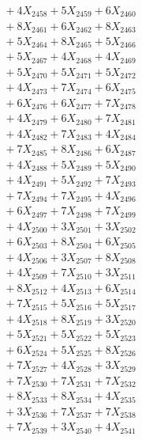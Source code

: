 \documentclass[a4paper,10pt]{article}
\begin{document}
{\begin{align}
&\;  + 4 X_{2458} + 5 X_{2459} + 6 X_{2460} \\[0.3ex]
&\;  + 8 X_{2461} + 6 X_{2462} + 8 X_{2463} \\[0.3ex]
&\;  + 5 X_{2464} + 8 X_{2465} + 5 X_{2466} \\[0.3ex]
&\;  + 5 X_{2467} + 4 X_{2468} + 4 X_{2469} \\[0.5ex]\allowbreak
&\;  + 5 X_{2470} + 5 X_{2471} + 5 X_{2472} \\[0.3ex]
&\;  + 4 X_{2473} + 7 X_{2474} + 6 X_{2475} \\[0.3ex]
&\;  + 6 X_{2476} + 6 X_{2477} + 7 X_{2478} \\[0.3ex]
&\;  + 4 X_{2479} + 6 X_{2480} + 7 X_{2481} \\[0.3ex]
&\;  + 4 X_{2482} + 7 X_{2483} + 4 X_{2484} \\[0.3ex]
&\;  + 7 X_{2485} + 8 X_{2486} + 6 X_{2487} \\[0.3ex]
&\;  + 4 X_{2488} + 5 X_{2489} + 5 X_{2490} \\[0.3ex]
&\;  + 4 X_{2491} + 5 X_{2492} + 7 X_{2493} \\[0.3ex]
&\;  + 7 X_{2494} + 7 X_{2495} + 4 X_{2496} \\[0.3ex]
&\;  + 6 X_{2497} + 7 X_{2498} + 7 X_{2499} \\[0.5ex]\allowbreak
&\;  + 4 X_{2500} + 3 X_{2501} + 3 X_{2502} \\[0.3ex]
&\;  + 6 X_{2503} + 8 X_{2504} + 6 X_{2505} \\[0.3ex]
&\;  + 4 X_{2506} + 3 X_{2507} + 8 X_{2508} \\[0.3ex]
&\;  + 4 X_{2509} + 7 X_{2510} + 3 X_{2511} \\[0.3ex]
&\;  + 8 X_{2512} + 4 X_{2513} + 6 X_{2514} \\[0.3ex]
&\;  + 7 X_{2515} + 5 X_{2516} + 5 X_{2517} \\[0.3ex]
&\;  + 4 X_{2518} + 8 X_{2519} + 3 X_{2520} \\[0.3ex]
&\;  + 5 X_{2521} + 5 X_{2522} + 5 X_{2523} \\[0.3ex]
&\;  + 6 X_{2524} + 5 X_{2525} + 8 X_{2526} \\[0.3ex]
&\;  + 7 X_{2527} + 4 X_{2528} + 3 X_{2529} \\[0.5ex]\allowbreak
&\;  + 7 X_{2530} + 7 X_{2531} + 7 X_{2532} \\[0.3ex]
&\;  + 8 X_{2533} + 8 X_{2534} + 4 X_{2535} \\[0.3ex]
&\;  + 3 X_{2536} + 7 X_{2537} + 7 X_{2538} \\[0.3ex]
&\;  + 7 X_{2539} + 3 X_{2540} + 4 X_{2541} \\[0.3ex]

\end{align}}
\end{document}

